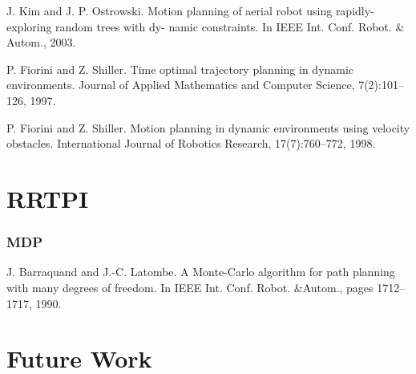\documentclass[MTech]{iitmdiss}
\begin{document}
 J. Kim and J. P. Ostrowski. Motion planning of aerial robot using rapidly-exploring random trees with dy- namic constraints. In IEEE Int. Conf. Robot. $\&$ Autom., 2003.
 
P. Fiorini and Z. Shiller. Time optimal trajectory planning in dynamic environments. Journal of Applied Mathematics and Computer Science, 7(2):101–126, 1997.

P. Fiorini and Z. Shiller. Motion planning in dynamic environments using velocity obstacles. International Journal of Robotics Research, 17(7):760–772, 1998. 
 
 
\chapter{RRTPI}
\subsection{MDP}


J. Barraquand and J.-C. Latombe. A Monte-Carlo algorithm for path planning with many degrees of freedom. In IEEE Int. Conf. Robot. $\&$Autom., pages 1712–1717, 1990.



\chapter{Future Work}

%
\pagebreak
\begin{singlespace}
  \begin{small}
	
  \end{small}
\end{singlespace}

\end{document}
